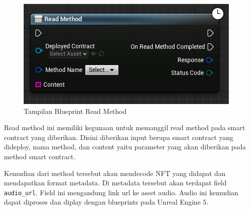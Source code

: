\begin{figure}[H]
  \centering

  \includegraphics[scale=0.6]{gambar/readmethod.png}

  \caption{Tampilan Blueprint Read Method}
  \label{fig:readmethod}
\end{figure}

Read method ini memiliki kegunaan untuk memanggil read method pada smart contract yang diberikan. Disini diberikan
input berupa smart contract yang dideploy, nama method, dan content yaitu parameter yang akan diberikan pada method smart contract.

Kemudian dari method tersebut akan mendecode NFT yang didapat dan mendapatkan format metadata. Di metadata tersebut akan terdapat field \texttt{audio\_url}.
Field ini mengandung link url ke asset audio. Audio ini kemudian dapat diproses dan diplay dengan blueprints pada Unreal Engine 5.
